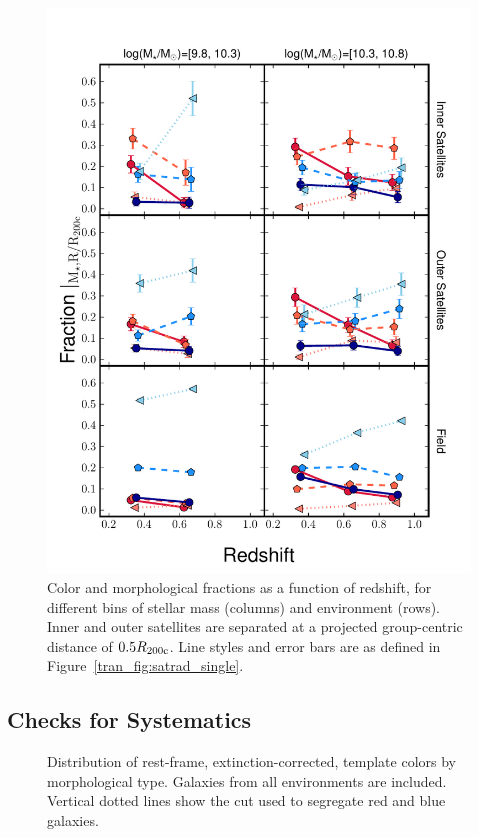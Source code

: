 \begin{figure}[htb]
\begin{center}
\includegraphics[scale=0.9]{transformers/fig4.pdf}
\caption{Color and morphological fractions as a function of redshift,
  for different bins of stellar mass (columns) and environment
  (rows). Inner and outer satellites are separated at a projected
  group-centric distance of $0.5 R_{\rm 200c}$. Line styles and error
  bars are as defined in Figure~\ref{tran_fig:satrad_single}.}
\label{tran_fig:satz}
\end{center}
\end{figure}

\subsection{Checks for Systematics}
\label{tran_s:systematics}

\begin{figure}[htb]
\caption{Distribution of rest-frame, extinction-corrected, template
  colors by morphological type. Galaxies from all environments are
  included. Vertical dotted lines show the cut used to segregate red
  and blue galaxies.}
\label{tran_fig:color_hist}
\end{figure}
 
